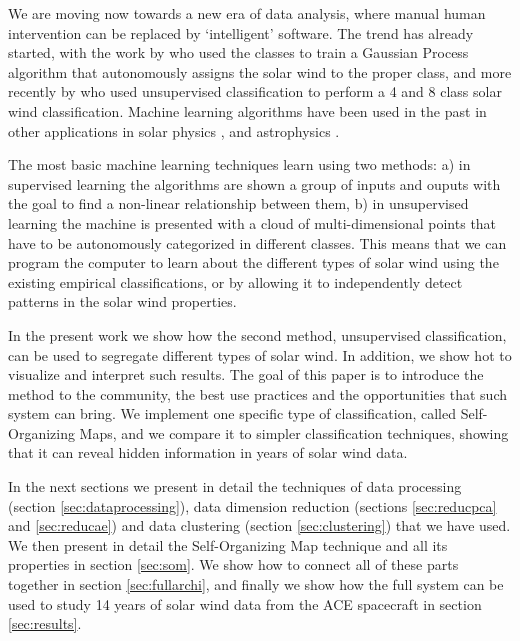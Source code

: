 We are moving now towards a new era of data analysis, where manual human intervention can be replaced by `intelligent' software. The trend has already started, with the work by \citep{Camporeale2017b} who used the \citep{Xu2015b} classes to train a Gaussian Process algorithm that autonomously assigns the solar wind to the proper class, and more recently by \citep{Roberts2020} who used unsupervised classification to perform a 4 and 8 class solar wind classification. Machine learning algorithms have been used in the past in other applications in solar physics \citep{Lundstedt1996,Qahwaji2008c,Ahmed2013c,Bobra2015,Bobra2016,Nishizuka2017c,Camporeale2018}, and astrophysics \citep{VanderPlas2012,Ntampaka2015,Hajian2015,Suveges2017,Bai2018,Bonjean2019}.

The most basic machine learning techniques learn using two methods: a) in supervised learning the algorithms are shown a group of inputs and ouputs with the goal to find a non-linear relationship between them, b) in unsupervised learning the machine is presented with a cloud of multi-dimensional points that have to be autonomously categorized in different classes. This means that we can program the computer to learn about the different types of solar wind using the existing empirical classifications, or by allowing it to independently detect patterns in the solar wind properties.

In the present work we show how the second method, unsupervised classification, can be used to segregate different types of solar wind. In addition, we show hot to visualize and interpret such results. The goal of this paper is to introduce the method to the community, the best use practices and the opportunities that such system can bring. We implement one specific type of classification, called Self-Organizing Maps, and we compare it to simpler classification techniques, showing that it can reveal hidden information in years of solar wind data.

In the next sections we present in detail the techniques of data processing (section \ref{sec:dataprocessing}), data dimension reduction (sections \ref{sec:reducpca} and \ref{sec:reducae}) and data clustering (section \ref{sec:clustering}) that we have used. We then present in detail the Self-Organizing Map technique and all its properties in section \ref{sec:som}. We show how to connect all of these parts together in section \ref{sec:fullarchi}, and finally we show how the full system can be used to study 14 years of solar wind data from the ACE spacecraft in section \ref{sec:results}.


